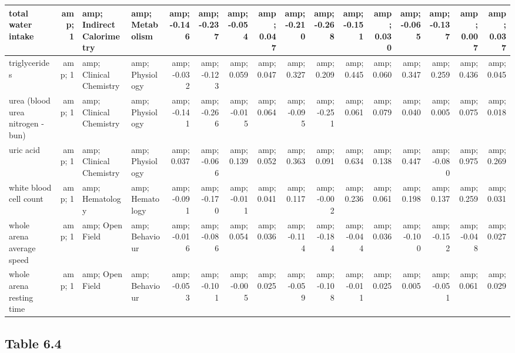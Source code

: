 \documentclass[]{article}
\newenvironment{Shaded}{\begin{snugshade}}{\end{snugshade}}
\newcommand{\CommentTok}[1]{\textcolor[rgb]{0.56,0.35,0.01}{\textit{#1}}}
\newcommand{\DataTypeTok}[1]{\textcolor[rgb]{0.13,0.29,0.53}{#1}}
\newcommand{\DecValTok}[1]{\textcolor[rgb]{0.00,0.00,0.81}{#1}}
\newcommand{\KeywordTok}[1]{\textcolor[rgb]{0.13,0.29,0.53}{\textbf{#1}}}
\newcommand{\NormalTok}[1]{#1}
\newcommand{\OperatorTok}[1]{\textcolor[rgb]{0.81,0.36,0.00}{\textbf{#1}}}
\newcommand{\StringTok}[1]{\textcolor[rgb]{0.31,0.60,0.02}{#1}}
\begin{document}
\begin{table}
\begin{tabular}[t]{l|r|l|l|r|r|r|r|r|r|r|r|r|r|r|r}
\hline
total water intake &amp; 1 &amp; Indirect Calorimetry &amp; Metabolism &amp; -0.146 &amp; -0.237 &amp; -0.054 &amp; 0.047 &amp; -0.210 &amp; -0.268 &amp; -0.151 &amp; 0.030 &amp; -0.065 &amp; -0.137 &amp; 0.007 &amp; 0.037\\
\hline
triglycerides &amp; 1 &amp; Clinical Chemistry &amp; Physiology &amp; -0.032 &amp; -0.123 &amp; 0.059 &amp; 0.047 &amp; 0.327 &amp; 0.209 &amp; 0.445 &amp; 0.060 &amp; 0.347 &amp; 0.259 &amp; 0.436 &amp; 0.045\\
\hline
urea (blood urea nitrogen - bun) &amp; 1 &amp; Clinical Chemistry &amp; Physiology &amp; -0.141 &amp; -0.266 &amp; -0.015 &amp; 0.064 &amp; -0.095 &amp; -0.251 &amp; 0.061 &amp; 0.079 &amp; 0.040 &amp; 0.005 &amp; 0.075 &amp; 0.018\\
\hline
uric acid &amp; 1 &amp; Clinical Chemistry &amp; Physiology &amp; 0.037 &amp; -0.066 &amp; 0.139 &amp; 0.052 &amp; 0.363 &amp; 0.091 &amp; 0.634 &amp; 0.138 &amp; 0.447 &amp; -0.080 &amp; 0.975 &amp; 0.269\\
\hline
white blood cell count &amp; 1 &amp; Hematology &amp; Hematology &amp; -0.091 &amp; -0.170 &amp; -0.011 &amp; 0.041 &amp; 0.117 &amp; -0.002 &amp; 0.236 &amp; 0.061 &amp; 0.198 &amp; 0.137 &amp; 0.259 &amp; 0.031\\
\hline
whole arena average speed &amp; 1 &amp; Open Field &amp; Behaviour &amp; -0.016 &amp; -0.086 &amp; 0.054 &amp; 0.036 &amp; -0.114 &amp; -0.184 &amp; -0.044 &amp; 0.036 &amp; -0.100 &amp; -0.152 &amp; -0.048 &amp; 0.027\\
\hline
whole arena resting time &amp; 1 &amp; Open Field &amp; Behaviour &amp; -0.053 &amp; -0.101 &amp; -0.005 &amp; 0.025 &amp; -0.059 &amp; -0.108 &amp; -0.011 &amp; 0.025 &amp; 0.005 &amp; -0.051 &amp; 0.061 &amp; 0.029\\
\hline
\end{tabular}
\end{table}

\hypertarget{table-6.4}{%
\subsection{Table 6.4}\label{table-6.4}}

\begin{Shaded}
\end{Shaded}
\end{document}
